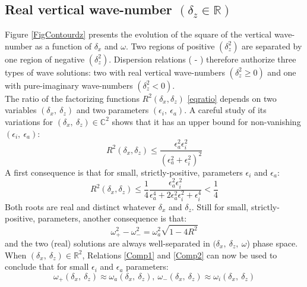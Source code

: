 \documentclass[a4paper,11pt]{article}
\begin{document}
\subsection{Real vertical wave-number $(\delta_z\in\mathbb{R})$}
Figure \ref{FigContourdz} presents the evolution of the square of the vertical wave-number as a function of $\delta_x$ and $\omega$. Two regions of positive $(\delta_z^2)$ are separated by one region of negative $(\delta_z^2)$. Dispersion relations ( - ) therefore authorize three types of wave solutions: two with real vertical wave-numbers $(\delta_z^2\geq0)$ and one with pure-imaginary wave-numbers $(\delta_z^2<0)$. \\

The ratio of the factorizing functions $\displaystyle R^2(\delta_x,\delta_z)$ \ref{eqratio} depends on two variables $(\delta_x,\ \delta_z)$ and two parameters $(\epsilon_i,\ \epsilon_a)$. A careful study of its variations for $(\delta_x,\ \delta_z)\in \mathbb{C}^2$ shows that it has an upper bound for non-vanishing $(\epsilon_i,\ \epsilon_a)$:
\begin{equation}
	 R^2(\delta_x,\delta_z) \leq
	\frac{\epsilon_a^2\epsilon_i^2}{\left
	(\epsilon_a^2+\epsilon_i^2
	\right)^2}
\end{equation}
A first consequence is that for small, strictly-positive, parameters $\epsilon_i$ and $\epsilon_a$:
\begin{equation}
	 R^2(\delta_x,\delta_z) 
	\leq
	\frac{1}{4}
	\frac{\epsilon_a^2\epsilon_i^2}{\epsilon_a^4+2\epsilon_a^2\epsilon_i^2+\epsilon_i^4} 
	<
	\frac{1}{4}
\end{equation}
Both roots are real and distinct whatever $\delta_x$ and $\delta_z$. Still for small, strictly-positive, parameters, another consequence is that:
\begin{equation}
    \omega_{+}^2-\omega_{-}^2 =\omega_a^2\sqrt{1-4 R^2}
	\label{deltaomegapm}
\end{equation}
and the two (real) solutions are always well-separated in $(\delta_x,\ \delta_z,\ \omega$) phase space.\\
When $(\delta_x,\ \delta_z)\in \mathbb{R}^2$, Relations \ref{Comp1} and \ref{Comp2} can now be used to conclude that for small $\epsilon_i$ and $\epsilon_a$ parameters:
\begin{equation}
	\omega_{+}(\delta_x,\ \delta_z) \approx \omega_a(\delta_x,\ \delta_z),\ 
	\omega_{-}(\delta_x,\ \delta_z) \approx \omega_i
	(\delta_x,\ \delta_z)
\end{equation}
\end{document}
